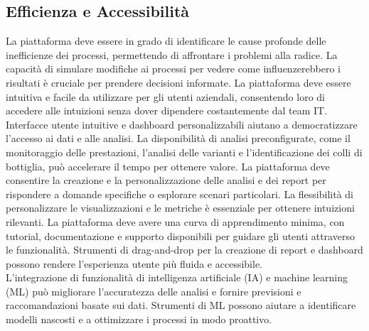 \documentclass{article}
\begin{document}
\subsection{Efficienza e Accessibilità}
La piattaforma deve essere in grado di identificare le cause profonde delle inefficienze dei processi, permettendo di affrontare i problemi alla radice. La capacità di simulare modifiche ai processi per vedere come influenzerebbero i risultati è cruciale per prendere decisioni informate. 
La piattaforma deve essere intuitiva e facile da utilizzare per gli utenti aziendali, consentendo loro di accedere alle intuizioni senza dover dipendere costantemente dal team IT. Interfacce utente intuitive e dashboard personalizzabili aiutano a democratizzare l'accesso ai dati e alle analisi. La disponibilità di analisi preconfigurate, come il monitoraggio delle prestazioni, l'analisi delle varianti e l'identificazione dei colli di bottiglia, può accelerare il tempo per ottenere valore. 
La piattaforma deve consentire la creazione e la personalizzazione delle analisi e dei report per rispondere a domande specifiche o esplorare scenari particolari. La flessibilità di personalizzare le visualizzazioni e le metriche è essenziale per ottenere intuizioni rilevanti. La piattaforma deve avere una curva di apprendimento minima, con tutorial, documentazione e supporto disponibili per guidare gli utenti attraverso le funzionalità. Strumenti di drag-and-drop per la creazione di report e dashboard possono rendere l'esperienza utente più fluida e accessibile.\\
L'integrazione di funzionalità di intelligenza artificiale (IA) e machine learning (ML) può migliorare l'accuratezza delle analisi e fornire previsioni e raccomandazioni basate sui dati. Strumenti di ML possono aiutare a identificare modelli nascosti e a ottimizzare i processi in modo proattivo.
\end{document}

